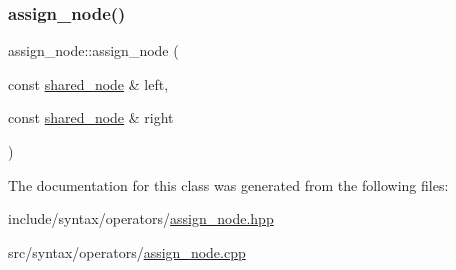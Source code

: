 \subsubsection{\texorpdfstring{assign\+\_\+node()}{assign\_node()}}
{\footnotesize\ttfamily assign\+\_\+node\+::assign\+\_\+node (\begin{DoxyParamCaption}\item[{const \hyperlink{namespacejawe_a3f307481d921b6cbb50cc8511fc2b544}{shared\+\_\+node} \&}]{left,  }\item[{const \hyperlink{namespacejawe_a3f307481d921b6cbb50cc8511fc2b544}{shared\+\_\+node} \&}]{right }\end{DoxyParamCaption})}



The documentation for this class was generated from the following files\+:\begin{DoxyCompactItemize}
\item 
include/syntax/operators/\hyperlink{assign__node_8hpp}{assign\+\_\+node.\+hpp}\item 
src/syntax/operators/\hyperlink{assign__node_8cpp}{assign\+\_\+node.\+cpp}\end{DoxyCompactItemize}
